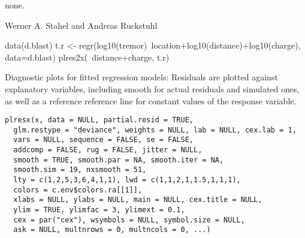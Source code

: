 \documentclass{article}
\begin{document}
\begin{Value}
none.
\end{Value}
\begin{Author}\relax
Werner A. Stahel and Andreas Ruckstuhl
\end{Author}
\begin{Examples}
\begin{ExampleCode}
  data(d.blast)
  t.r <- regr(log10(tremor)~location+log10(distance)+log10(charge),
            data=d.blast)
  plres2x(~distance+charge, t.r)
\end{ExampleCode}
\end{Examples}

\begin{Description}\relax
Diagnostic plots for fitted regression models:
Residuals are plotted against explanatory variables,
including smooth for actual residuals and simulated ones,
as well as a reference reference line for constant values of the
response variable.
\end{Description}
\begin{Usage}
\begin{verbatim}
plresx(x, data = NULL, partial.resid = TRUE,
  glm.restype = "deviance", weights = NULL, lab = NULL, cex.lab = 1,
  vars = NULL, sequence = FALSE, se = FALSE,
  addcomp = FALSE, rug = FALSE, jitter = NULL,
  smooth = TRUE, smooth.par = NA, smooth.iter = NA, 
  smooth.sim = 19, nxsmooth = 51,
  lty = c(1,2,5,3,6,4,1,1), lwd = c(1,1,2,1,1.5,1,1,1),
  colors = c.env$colors.ra[[1]],
  xlabs = NULL, ylabs = NULL, main = NULL, cex.title = NULL,
  ylim = TRUE, ylimfac = 3, ylimext = 0.1,
  cex = par("cex"), wsymbols = NULL, symbol.size = NULL,
  ask = NULL, multnrows = 0, multncols = 0, ...)
\end{verbatim}
\end{Usage}
\end{document}
